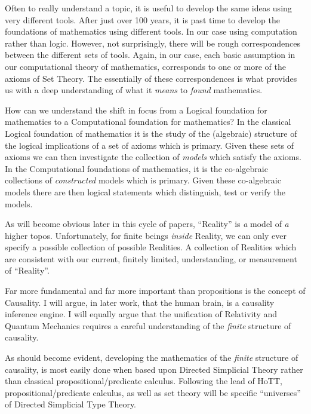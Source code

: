 \documentclass[a4paper,openany]{amsbook}
\begin{document}
Often to really understand a topic, it is useful to develop the same ideas using
very different tools. After just over 100 years, it is past time to develop the
foundations of mathematics using different tools.  In our case using computation
rather than logic. However, not surprisingly, there will be rough
correspondences between the different sets of tools. Again, in our case, each
basic assumption in our computational theory of mathematics, corresponds to one
or more of the axioms of Set Theory. The essentially of these correspondences
is what provides us with a deep understanding of what it \emph{means} to
\emph{found} mathematics.

How can we understand the shift in focus from a Logical foundation for
mathematics to a Computational foundation for mathematics? In the classical
Logical foundation of mathematics it is the study of the (algebraic) structure
of the logical implications of a set of axioms which is primary. Given these
sets of axioms we can then investigate the collection of \emph{models} which
satisfy the axioms. In the Computational foundations of mathematics, it is the
co-algebraic collections of \emph{constructed} models which is primary.  Given
these co-algebraic models there are then logical statements which distinguish,
test or verify the models.


As will become obvious later in this cycle of papers, ``Reality'' is \emph{a}
model of \emph{a} higher topos.  Unfortunately, for finite beings \emph{inside}
Reality, we can only ever specify a possible collection of possible Realities. A
collection of Realities which are consistent with our current, finitely limited,
understanding, or measurement of ``Reality''.

Far more fundamental and far more important than propositions is the concept of
Causality.  I will argue, in later work, that the human brain, is a causality
inference engine. I will equally argue that the unification of Relativity and
Quantum Mechanics requires a careful understanding of the \emph{finite}
structure of causality.

As should become evident, developing the mathematics of the \emph{finite}
structure of causality, is most easily done when based upon Directed Simplicial
Theory rather than classical propositional/predicate calculus. Following the
lead of HoTT, propositional/predicate calculus, as well as set theory will be
specific ``universes'' of Directed Simplicial Type Theory.
\end{document}
